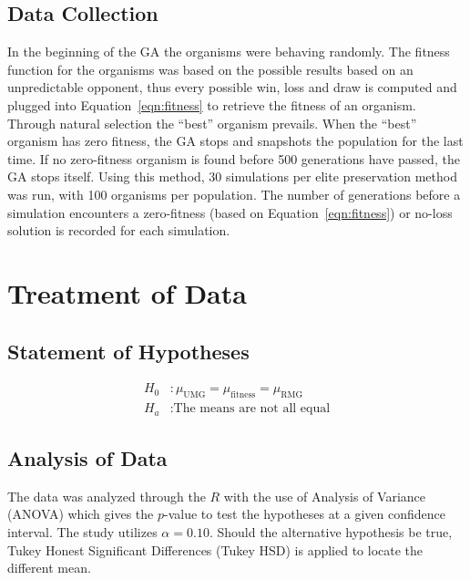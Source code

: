 \documentclass{strrespaper-trad}
\begin{document}
			\subsection{Data Collection}
				In the beginning of the GA the organisms were behaving randomly.
				The fitness function for the organisms was based on the possible results based on an unpredictable opponent, thus every possible win, loss and draw is computed and plugged into Equation~\ref{eqn:fitness} to retrieve the fitness of an organism.
				Through natural selection the \enquote{best} organism prevails.
				When the \enquote{best} organism has zero fitness, the GA stops and snapshots the population for the last time.
				If no zero-fitness organism is found before 500 generations have passed, the GA stops itself.
				Using this method, 30 simulations per elite preservation method was run, with 100 organisms per population.
				The number of generations before a simulation encounters a zero-fitness (based on Equation~\ref{eqn:fitness}) or no-loss solution is recorded for each simulation.

		\section{Treatment of Data}
			\subsection{Statement of Hypotheses} \vspace{-2em}
				\begin{align*}
					H_0 & : \mu_\mathrm{UMG} = \mu_\mathrm{fitness} = \mu_\mathrm{RMG} \\
					H_a & : \text{The means are not all equal}
				\end{align*}
			\subsection{Analysis of Data}
				The data was analyzed through the $R$ with the use of Analysis of Variance (ANOVA) which gives the $p$-value to test the hypotheses at a given confidence interval.
				The study utilizes $\alpha = 0.10$.
				Should the alternative hypothesis be true, Tukey Honest Significant Differences (Tukey HSD) is applied to locate the different mean.
\end{document}
